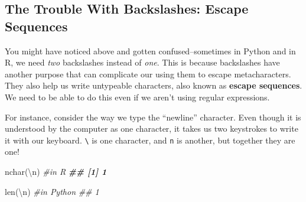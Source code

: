 \documentclass[
  12pt,
  krantz2]{krantz}
\makeatletter
\newenvironment{Shaded}{\begin{snugshade}}{\end{snugshade}}
\newcommand{\AttributeTok}[1]{\textcolor[rgb]{0.61,0.61,0.61}{#1}}
\newcommand{\BuiltInTok}[1]{#1}
\newcommand{\CharTok}[1]{\textcolor[rgb]{0.5,0.5,0.5}{#1}}
\newcommand{\CommentTok}[1]{\textcolor[rgb]{0.37,0.37,0.37}{\textit{#1}}}
\newcommand{\ConstantTok}[1]{\textcolor[rgb]{0,0,0}{#1}}
\newcommand{\DocumentationTok}[1]{\textcolor[rgb]{0.37,0.37,0.37}{\textbf{\textit{#1}}}}
\newcommand{\FunctionTok}[1]{\textcolor[rgb]{0,0,0}{#1}}
\newcommand{\NormalTok}[1]{#1}
\newcommand{\SpecialCharTok}[1]{\textcolor[rgb]{0,0,0}{#1}}
\newcommand{\StringTok}[1]{\textcolor[rgb]{0.5,0.5,0.5}{#1}}
\newenvironment{kframe}{%
\medskip{}
\setlength{\fboxsep}{.8em}
 \def\at@end@of@kframe{}%
 \ifinner\ifhmode%
  \def\at@end@of@kframe{\end{minipage}}%
  \begin{minipage}{\columnwidth}%
 \fi\fi%
 \def\FrameCommand##1{\hskip\@totalleftmargin \hskip-\fboxsep
 \colorbox{shadecolor}{##1}\hskip-\fboxsep
     \hskip-\linewidth \hskip-\@totalleftmargin \hskip\columnwidth}%
 \MakeFramed {\advance\hsize-\width
   \@totalleftmargin\z@ \linewidth\hsize
   \@setminipage}}%
 {\par\unskip\endMakeFramed%
 \at@end@of@kframe}
\renewenvironment{Shaded}{\begin{kframe}}{\end{kframe}}
\makeatother
\begin{document}
\begin{Shaded}
\end{Shaded}

\hypertarget{the-trouble-with-backslashes-escape-sequences}{%
\subsection{The Trouble With Backslashes: Escape Sequences}\label{the-trouble-with-backslashes-escape-sequences}}

You might have noticed above and gotten confused--sometimes in Python and in R, we need \emph{two} backslashes instead of \emph{one}. This is because backslashes have another purpose that can complicate our using them to escape metacharacters. They also help us write untypeable characters, also known as \textbf{escape sequences}. We need to be able to do this even if we aren't using regular expressions.

For instance, consider the way we type the ``newline'' character. Even though it is understood by the computer as one character, it takes us two keystrokes to write it with our keyboard. \texttt{\textbackslash{}} is one character, and \texttt{n} is another, but together they are one!

\begin{Shaded}
\begin{Highlighting}[]
\FunctionTok{nchar}\NormalTok{(}\StringTok{\textquotesingle{}}\SpecialCharTok{\textbackslash{}n}\StringTok{\textquotesingle{}}\NormalTok{) }\CommentTok{\#in R}
\DocumentationTok{\#\# [1] 1}
\end{Highlighting}
\end{Shaded}

\begin{Shaded}
\begin{Highlighting}[]
\BuiltInTok{len}\NormalTok{(}\StringTok{\textquotesingle{}}\CharTok{\textbackslash{}n}\StringTok{\textquotesingle{}}\NormalTok{) }\CommentTok{\#in Python}
\CommentTok{\#\# 1}
\end{Highlighting}
\end{Shaded}
\end{document}
